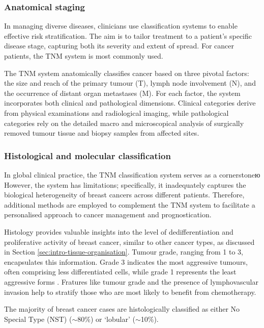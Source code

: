 \subsubsection{Anatomical staging}

In managing diverse diseases, clinicians use classification systems to enable effective risk stratification. The aim is to tailor treatment to a patient's specific disease stage, capturing both its severity and extent of spread. For cancer patients, the TNM system is most commonly used.

The TNM system anatomically classifies cancer based on three pivotal factors: the size and reach of the primary tumour (T), lymph node involvement (N), and the occurrence of distant organ metastases (M). For each factor, the system incorporates both clinical and pathological dimensions. Clinical categories derive from physical examinations and radiological imaging, while pathological categories rely on the detailed macro and microscopical analysis of surgically removed tumour tissue and biopsy samples from affected sites.

\subsubsection{Histological and molecular classification}

In global clinical practice, the TNM classification system serves as a cornerstoneю However, the system has limitations; specifically, it inadequately captures the biological heterogeneity of breast cancers across different patients. Therefore, additional methods are employed to complement the TNM system to facilitate a personalised approach to cancer management and prognostication.

Histology provides valuable insights into the level of dedifferentiation and proliferative activity of breast cancer, similar to other cancer types, as discussed in Section \cref{sec:intro-tissue-organisation}. Tumour grade, ranging from 1 to 3, encapsulates this information. Grade 3 indicates the most aggressive tumours, often comprising less differentiated cells, while grade 1 represents the least aggressive forms \parencite{Greenough1925-wg, Elston1991-md}. Fratures like tumour grade and the presence of lymphovascular invasion help to stratify those who are most likely to benefit from chemotherapy. 

The majority of breast cancer cases are histologically classified as either No Special Type (NST) ($\sim$80\%) or `lobular' ($\sim$10\%).

